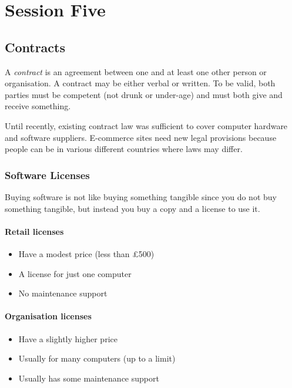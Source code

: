 \section{Session Five}\label{sec:fpse_session_five}

\subsection{Contracts}\label{sub:contracts}

A \emph{contract} is an agreement between one and at least one other person or organisation.
A contract may be either verbal or written.
To be valid, both parties must be competent (not drunk or under-age) and must both give and receive something.

Until recently, existing contract law was sufficient to cover computer hardware and software suppliers.
E-commerce sites need new legal provisions because people can be in various different countries where laws may differ.

\subsubsection{Software Licenses}\label{ssub:software_licenses}

Buying software is not like buying something tangible since you do not buy something tangible, but instead you buy a copy and a license to use it.

\paragraph{Retail licenses}\label{par:retail_licenses}

\begin{itemize}
	\item Have a modest price (less than £500)
	\item A license for just one computer
	\item No maintenance support
\end{itemize}

\paragraph{Organisation licenses}\label{par:organisation_licenses}

\begin{itemize}
	\item Have a slightly higher price
	\item Usually for many computers (up to a limit)
	\item Usually has some maintenance support
\end{itemize}

